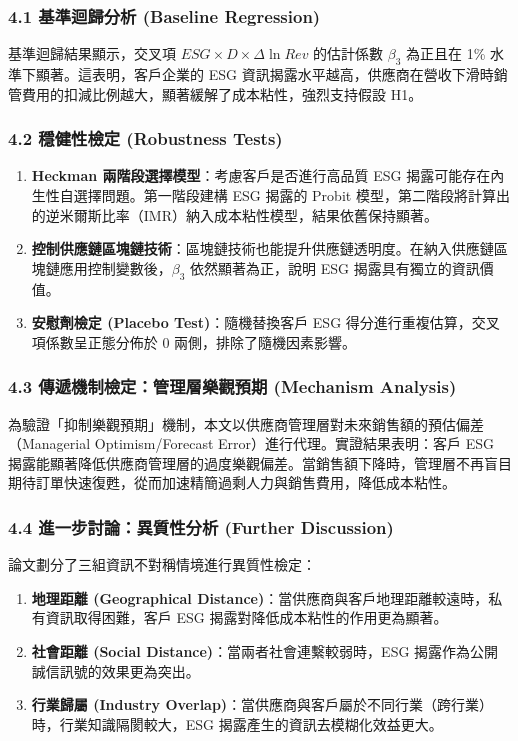 \documentclass[11pt,a4paper]{article}
\begin{document}
\subsubsection{4.1 基準迴歸分析 (Baseline Regression)}
基準迴歸結果顯示，交叉項 $ESG \times D \times \Delta \ln Rev$ 的估計係數 $\beta_3$ 為正且在 1\% 水準下顯著。這表明，客戶企業的 ESG 資訊揭露水平越高，供應商在營收下滑時銷管費用的扣減比例越大，顯著緩解了成本粘性，強烈支持假設 H1。

\subsubsection{4.2 穩健性檢定 (Robustness Tests)}
\begin{enumerate}[leftmargin=2em]
    \item \textbf{Heckman 兩階段選擇模型}：考慮客戶是否進行高品質 ESG 揭露可能存在內生性自選擇問題。第一階段建構 ESG 揭露的 Probit 模型，第二階段將計算出的逆米爾斯比率（IMR）納入成本粘性模型，結果依舊保持顯著。
    \item \textbf{控制供應鏈區塊鏈技術}：區塊鏈技術也能提升供應鏈透明度。在納入供應鏈區塊鏈應用控制變數後，$\beta_3$ 依然顯著為正，說明 ESG 揭露具有獨立的資訊價值。
    \item \textbf{安慰劑檢定 (Placebo Test)}：隨機替換客戶 ESG 得分進行重複估算，交叉項係數呈正態分佈於 0 兩側，排除了隨機因素影響。
\end{enumerate}

\subsubsection{4.3 傳遞機制檢定：管理層樂觀預期 (Mechanism Analysis)}
為驗證「抑制樂觀預期」機制，本文以供應商管理層對未來銷售額的預估偏差（Managerial Optimism/Forecast Error）進行代理。實證結果表明：客戶 ESG 揭露能顯著降低供應商管理層的過度樂觀偏差。當銷售額下降時，管理層不再盲目期待訂單快速復甦，從而加速精簡過剩人力與銷售費用，降低成本粘性。

\subsubsection{4.4 進一步討論：異質性分析 (Further Discussion)}
論文劃分了三組資訊不對稱情境進行異質性檢定：
\begin{enumerate}[leftmargin=2em]
    \item \textbf{地理距離 (Geographical Distance)}：當供應商與客戶地理距離較遠時，私有資訊取得困難，客戶 ESG 揭露對降低成本粘性的作用更為顯著。
    \item \textbf{社會距離 (Social Distance)}：當兩者社會連繫較弱時，ESG 揭露作為公開誠信訊號的效果更為突出。
    \item \textbf{行業歸屬 (Industry Overlap)}：當供應商與客戶屬於不同行業（跨行業）時，行業知識隔閡較大，ESG 揭露產生的資訊去模糊化效益更大。
\end{enumerate}
\end{document}
